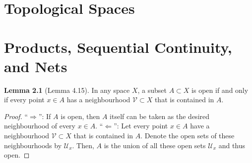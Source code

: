 \documentclass[a4paper]{book}
\theoremstyle{definition}
\newtheorem{lemma}[definition]{Lemma}
\begin{document}
\chapter{Topological Spaces}
\chapter{Products, Sequential Continuity, and Nets}

\begin{thmbox}
    \begin{lemma}[Lemma 4.15]
        In any space \(X\), a subset \(A \subset X\) is open if and only if every point \(x \in A\) has a neighbourhood \(\mathcal{V} \subset X\) that is contained in \(A\).
    \end{lemma}
\end{thmbox}
\begin{proof}
    ``\(\Rightarrow\)'': If \(A\) is open, then \(A\) itself can be taken as the desired neighbourhood of every \(x \in A\).
    ``\(\Leftarrow\)'': Let every point \(x \in A\) have a neighbourhood \(\mathcal{V} \subset X\) that is contained in \(A\). Denote the open sets of these neighbourhoods by \(\mathcal{U}_x\). Then, \(A\) is the union of all these open sets \(\mathcal{U}_x\) and thus open.
\end{proof}
\end{document}

